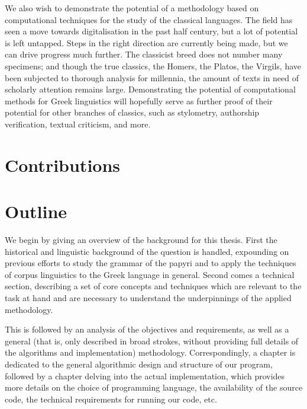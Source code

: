 We also wish to demonstrate the potential of a methodology based on
computational techniques for the study of the classical languages. The
field has seen a move towards digitalisation in the past half century,
but a lot of potential is left untapped. Steps in the right direction
are currently being made, but we can drive progress much further. The
classicist breed does not number many specimens; and though the true
classics, the Homers, the Platos, the Virgils, have been subjected to
thorough analysis for millennia, the amount of texts in need of
scholarly attention remains large. Demonstrating the potential of
computational methods for Greek linguistics will hopefully serve as
further proof of their potential for other branches of classics, such
as stylometry, authorship verification, textual criticism, and more.



\section{Contributions}

\section{Outline}

We begin by giving an overview of the background for this thesis.
First the historical and linguistic background of the question is
handled, expounding on previous efforts to study the grammar of the
papyri and to apply the techniques of corpus linguistics to the Greek
language in general. Second comes a technical section, describing a
set of core concepts and techniques which are relevant to the task at
hand and are necessary to understand the underpinnings of the applied
methodology.

This is followed by an analysis of the objectives and requirements, as
well as a general (that is, only described in broad strokes, without
providing full details of the algorithms and implementation)
methodology. Correspondingly, a chapter is dedicated to the general
algorithmic design and structure of our program, followed by a chapter
delving into the actual implementation, which provides more details on
the choice of programming language, the availability of the source
code, the technical requirements for running our code, etc.

